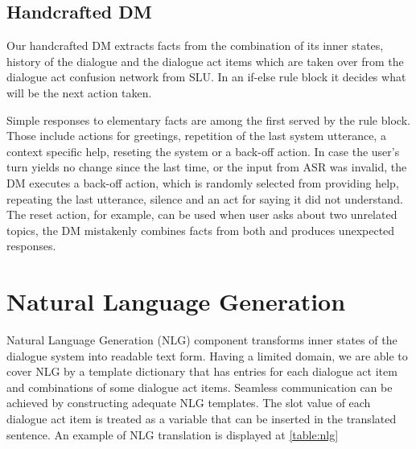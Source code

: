 \subsection{Handcrafted DM}

Our handcrafted DM extracts facts from the combination of its inner states, history of the dialogue and the dialogue act items which are taken over from the dialogue act confusion network from SLU.
In an if-else rule block it decides what will be the next action taken.

Simple responses to elementary facts are among the first served by the rule block.
Those include actions for greetings, repetition of the last system utterance, a context specific help, reseting the system or a back-off action.
In case the user's turn yields no change since the last time, or the input from ASR was invalid, the DM executes a back-off action, which is randomly selected from providing help, repeating the last utterance, silence and an act for saying it did not understand.
The reset action, for example, can be used when user asks about two unrelated topics, the DM mistakenly combines facts from both and 
produces unexpected responses.

\section{Natural Language Generation}

Natural Language Generation (NLG) component transforms inner states of the dialogue system into readable text form.
Having a limited domain, we are able to cover NLG by a template dictionary that has entries for each dialogue act item and combinations of some dialogue act items.
Seamless communication can be achieved by constructing adequate NLG templates.
The slot value of each dialogue act item is treated as a variable that can be inserted in the translated sentence.
An example of NLG translation is displayed at \ref{table:nlg}

\begin{table}[h]
\centering
\small
\hspace*{-3pt}
\caption{Translation example of dialogue act to sentence by Natural Language Generation component}
\label{table:nlg}
\end{table}

